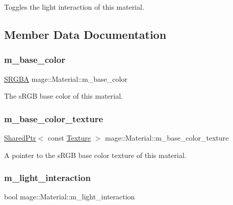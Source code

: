 Toggles the light interaction of this material. 

\subsection{Member Data Documentation}
\hypertarget{classmage_1_1_material_a1b26923506e178f688865f79bfb93739}{}\label{classmage_1_1_material_a1b26923506e178f688865f79bfb93739} 
\subsubsection{\texorpdfstring{m\+\_\+base\+\_\+color}{m\_base\_color}}
{\footnotesize\ttfamily \hyperlink{structmage_1_1_s_r_g_b_a}{S\+R\+G\+BA} mage\+::\+Material\+::m\+\_\+base\+\_\+color\hspace{0.3cm}{\ttfamily [private]}}

The s\+R\+GB base color of this material. \hypertarget{classmage_1_1_material_ae3d40b79a275a212ea7068b0c3f8840c}{}\label{classmage_1_1_material_ae3d40b79a275a212ea7068b0c3f8840c} 
\subsubsection{\texorpdfstring{m\+\_\+base\+\_\+color\+\_\+texture}{m\_base\_color\_texture}}
{\footnotesize\ttfamily \hyperlink{namespacemage_a1e01ae66713838a7a67d30e44c67703e}{Shared\+Ptr}$<$ const \hyperlink{classmage_1_1_texture}{Texture} $>$ mage\+::\+Material\+::m\+\_\+base\+\_\+color\+\_\+texture\hspace{0.3cm}{\ttfamily [private]}}

A pointer to the s\+R\+GB base color texture of this material. \hypertarget{classmage_1_1_material_a636ddbd882e3ff2841c192c5ecbc5053}{}\label{classmage_1_1_material_a636ddbd882e3ff2841c192c5ecbc5053} 
\subsubsection{\texorpdfstring{m\+\_\+light\+\_\+interaction}{m\_light\_interaction}}
{\footnotesize\ttfamily bool mage\+::\+Material\+::m\+\_\+light\+\_\+interaction\hspace{0.3cm}{\ttfamily [private]}}

